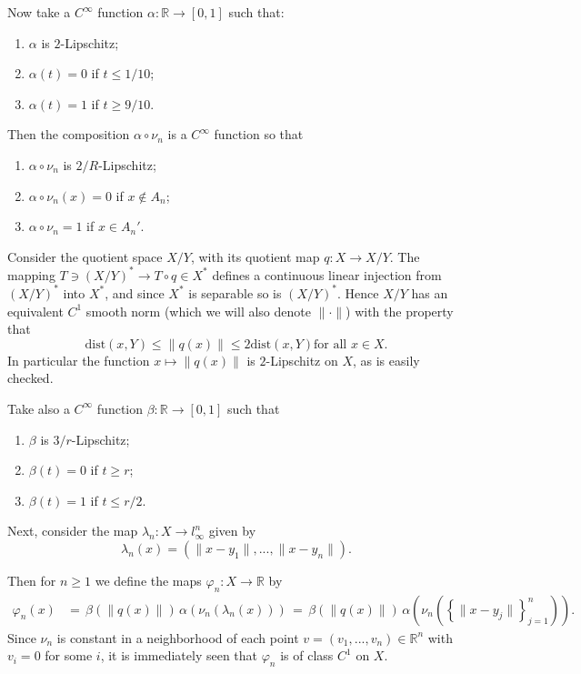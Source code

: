 \documentclass[11pt]{amsproc}%
\theoremstyle{plain}
\numberwithin{equation}{section}
\begin{document}
\medskip

Now take a $C^{\infty}$ function $\alpha:\mathbb{R}\to [0,1]$ such
that:
\begin{enumerate}
\item[{}] $\alpha$ is $2$-Lipschitz;
\item[{}] $\alpha(t)=0$ if $t\leq 1/10$;
\item[{}] $\alpha(t)=1$ if $t\geq 9/10$.
\end{enumerate}
Then the composition $\alpha\circ\nu_n$ is a $C^{\infty}$ function
so that
\begin{enumerate}
\item[{}] $\alpha\circ\nu_n$ is $2/R$-Lipschitz;
\item[{}] $\alpha\circ\nu_n(x)=0$ if $x\notin A_n$;
\item[{}] $\alpha\circ\nu_n=1$ if $x\in {A_n}'$.
\end{enumerate}

Consider the quotient space $X/Y$, with its quotient map $q:X\to
X/Y$. The mapping $T\ni (X/Y)^{*}\to T\circ q \in X^{*}$ defines a
continuous linear injection from $(X/Y)^{*}$ into $X^{*}$, and
since $X^{*}$ is separable so is $(X/Y)^{*}$. Hence $X/Y$ has an
equivalent $C^1$ smooth norm (which we will also denote
$\|\cdot\|$) with the property that
    $$
\textrm{dist}(x, Y)\leq \|q(x)\|\leq 2\textrm{dist}(x,Y) \textrm{
for all } x\in X.
    $$
In particular the function $x\mapsto \|q(x)\|$ is $2$-Lipschitz on
$X$, as is easily checked.

Take also a $C^\infty$ function $\beta:\mathbb{R}\to [0,1]$ such
that
\begin{enumerate}
\item[{}] $\beta$ is $3/r$-Lipschitz;
\item[{}] $\beta(t)=0$ if $t\geq r$;
\item[{}] $\beta(t)=1$ if $t\leq r/2$.
\end{enumerate}


\noindent Next, consider the map $\lambda_{n}:X\rightarrow
l_{\infty}^{n}$ given by
\[
\lambda_{n}\left(  x\right)  =\left( \| x- y_{1}\| ,..., \| x-
y_{n}\| \right).
\]

\medskip

\noindent Then for $n\geq1$ we define the maps $\varphi
_{n}:X\rightarrow\mathbb{R}$ by
\begin{align*}
\varphi_{n}\left(  x\right)   &  = \, \beta\left(\|q(x)\|\right)\,
\alpha\left(\nu_{n}\left( \lambda_{n}\left( x\right)
\right)\right) \, = \, \beta\left(\|q(x)\|\right)\,
\alpha\left(\nu_{n}\left( \left\{ \| x-y_{j} \| \right\}
_{j=1}^{n}\right)\right).
\end{align*}
Since $\nu_n$ is constant in a neighborhood of each point $v=(v_1,
..., v_n)\in \mathbb{R}^{n}$ with $v_i=0$ for some $i$, it is
immediately seen that $\varphi_n$ is of class $C^1$ on $X$.
\end{document}
